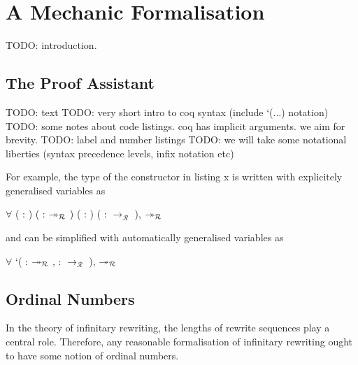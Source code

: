 \chapter{A Mechanic Formalisation}\label{chap:implementation}

TODO: introduction.


\section{The \Coq Proof Assistant}

TODO: text
TODO: very short intro to coq syntax (include `(...) notation)
TODO: some notes about code listings. coq has implicit arguments. we aim for
brevity.
TODO: label and number listings
TODO: we will take some notational liberties (syntax precedence levels, infix
notation etc)

For example, the type of the  constructor in listing x
is written with explicitely generalised variables as
\begin{singlespace}
\begin{coqdoccode}
\coqdocnoindent
\ensuremath{\forall} (  :
) (\coqdocvar{$\rho$}
:  $\twoheadrightarrow_\mathcal{R}$ )
( : )
(\coqdocvar{$\pi$} : 
$\rightarrow_\mathcal{R}$ ),
 $\twoheadrightarrow_\mathcal{R}$
\coqdoceol
\end{coqdoccode}
\end{singlespace}
and can be simplified with automatically generalised variables as
\begin{singlespace}
\begin{coqdoccode}
\coqdocnoindent
\ensuremath{\forall} `(\coqdocvar{$\rho$} : 
$\twoheadrightarrow_\mathcal{R}$ ,
\coqdocvar{$\pi$} :  $\rightarrow_\mathcal{R}$ ),
 $\twoheadrightarrow_\mathcal{R}$
\coqdoceol
\end{coqdoccode}
\end{singlespace}


\section{Ordinal Numbers}

In the theory of infinitary rewriting, the lengths of rewrite sequences play
a central role. Therefore, any reasonable formalisation of infinitary
rewriting ought to have some notion of ordinal numbers.

